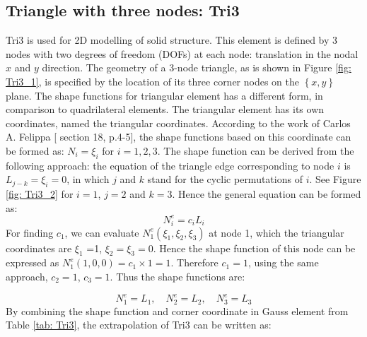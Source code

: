\subsection{Triangle with three nodes: Tri3}
Tri3 is used for 2D modelling of solid structure. This element is defined by 3 nodes with two degrees of freedom (DOFs) at each node: translation in the nodal $x$ and $y$ direction. The geometry of a 3-node triangle, as is shown in Figure \ref{fig: Tri3_1}, is specified by the location of its three corner nodes on the $\left\{x, y\right\}$ plane. The shape functions for triangular element has a different form, in comparison to quadrilateral elements. The triangular element has its own coordinates, named the triangular coordinates. According to the work of Carlos A. Felippa [\cite{Felippa} section 18, p.4-5], the shape functions based on this coordinate can be formed as: $N_i = \xi_i$ for $i = 1, 2, 3.$ The shape function can be derived from the following approach: the equation of the triangle edge corresponding to node $i$ is $L_{j-k} = \xi_i = 0$, in which $j$ and $k$ stand for the cyclic permutations of $i$. See Figure \ref{fig: Tri3_2} for $i = 1$, $j=2$ and $k = 3$. Hence the general equation can be formed as:
\begin{equation}
N_i^e = c_iL_i
\end{equation}
For finding $c_1$, we can evaluate $N_1^e\left(\xi_1, \xi_2, \xi_3\right)$ at node 1, which the triangular coordinates are $\xi_1$ =1, $\xi_2 = \xi_3 = 0$.  Hence the shape function of this node can be expressed as $N_1^e\left(1,0,0\right) = c_1 \times 1 = 1$. Therefore $c_1 = 1$, using the same approach, $c_2 = 1$, $c_3 = 1$. Thus the shape functions are:

\begin{equation}
N_1^e = L_1 , \quad N_2^e = L_2, \quad N_3^e = L_3
\end{equation}
By combining the shape function and corner coordinate in Gauss element from Table \ref{tab: Tri3}, the extrapolation of Tri3 can be written as:

